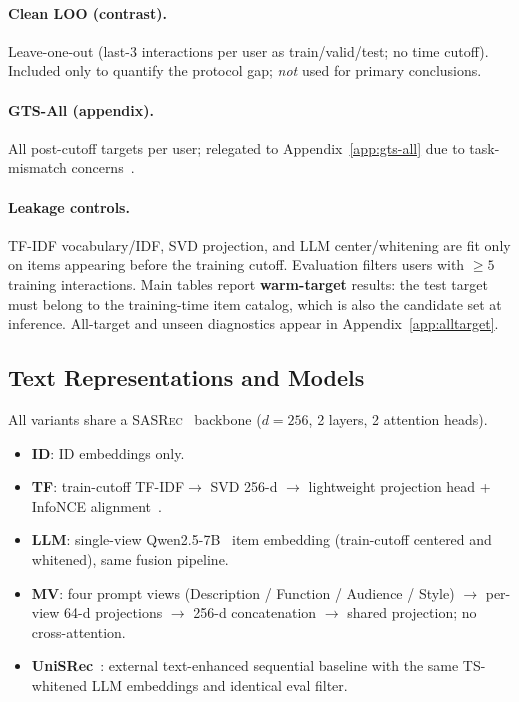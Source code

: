 \documentclass[sigconf,natbib=true,anonymous]{acmart}
\newcommand{\tfidf}{\textsc{TF-IDF}\xspace}
\newcommand{\base}{\textsc{SASRec}\xspace}
\begin{document}
\paragraph{Clean LOO (contrast).}
Leave-one-out (last-3 interactions per user as train/valid/test; no time cutoff).
Included only to quantify the protocol gap; \emph{not} used for primary conclusions.

\paragraph{GTS-All (appendix).}
All post-cutoff targets per user; relegated to Appendix~\ref{app:gts-all} due to task-mismatch concerns~\cite{gusak2025time}.

\paragraph{Leakage controls.}
\tfidf vocabulary/IDF, SVD projection, and LLM center/whitening are fit only on items appearing before the training cutoff.
Evaluation filters users with $\ge 5$ training interactions.
Main tables report \textbf{warm-target} results: the test target must belong to the training-time item catalog, which is also the candidate set at inference.
All-target and unseen diagnostics appear in Appendix~\ref{app:alltarget}.

\subsection{Text Representations and Models}
\label{sec:models}

All variants share a \base~\cite{kang2018sasrec} backbone ($d{=}256$, 2 layers, 2 attention heads).

\begin{itemize}[leftmargin=*,itemsep=1pt]
\item \textbf{ID}: ID embeddings only.
\item \textbf{TF}: train-cutoff \tfidf $\to$ SVD 256-d $\to$ lightweight projection head + InfoNCE alignment~\cite{oord2018cpc}.
\item \textbf{LLM}: single-view Qwen2.5-7B~\cite{qwen2024qwen25} item embedding (train-cutoff centered and whitened), same fusion pipeline.
\item \textbf{MV}: four prompt views (Description / Function / Audience / Style) $\to$ per-view 64-d projections $\to$ 256-d concatenation $\to$ shared projection; no cross-attention.
\item \textbf{UniSRec}~\cite{hou2022unisrec}: external text-enhanced sequential baseline with the same TS-whitened LLM embeddings and identical eval filter.
\end{itemize}
\end{document}
